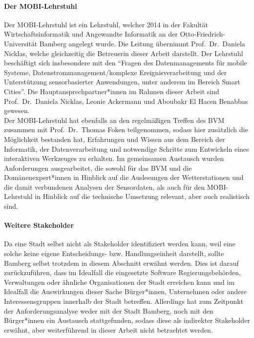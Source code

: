 \paragraph{Der \ac{MOBI-Lehrstuhl}}
Der \ac{MOBI-Lehrstuhl} ist ein Lehrstuhl, welcher 2014 in der Fakultät Wirtschaftsinformatik und Angewandte Informatik an der Otto-Friedrich-Universität Bamberg angelegt wurde. Die Leitung übernimmt Prof.\ Dr.\ Daniela Nicklas, welche gleichzeitig die Betreuerin dieser Arbeit darstellt. Der Lehrstuhl beschäftigt sich insbesondere mit den \enquote{Fragen des Datenmanagements für mobile Systeme, Datenstrommanagement/komplexe Ereignisverarbeitung und der Unterstützung sensorbasierter Anwendungen, unter anderem im Bereich Smart Cities}. Die Hauptansprechpartner*innen im Rahmen dieser Arbeit sind Prof.\ Dr.\ Daniela Nicklas, Leonie Ackermann und Aboubakr El Hacen Benabbas gewesen. \\ Der MOBI-Lehrstuhl hat ebenfalls an den regelmäßigen Treffen des \ac{BVM} zusammen mit Prof.\ Dr.\ Thomas Foken teilgenommen, sodass hier zusätzlich die Möglichkeit bestanden hat, Erfahrungen und Wissen aus dem Bereich der Informatik, der Datenverarbeitung und notwendige Schritte zum Entwickeln eines interaktiven Werkzeuges zu erhalten. Im gemeinsamen Austausch wurden Anforderungen ausgearbeitet, die sowohl für das \ac{BVM} und die Domänenexpert*innen in Hinblick auf die Auslesungen der Wetterstationen und die damit verbundenen Analysen der Sensordaten, als auch für den \ac{MOBI-Lehrstuhl} in Hinblick auf die technische Umsetzung relevant, aber auch realistisch sind. 

\paragraph{Weitere Stakeholder}
Da eine Stadt selbst nicht als Stakeholder identifiziert werden kann, weil eine solche keine eigene Entscheidungs- bzw. Handlungseinheit darstellt, sollte Bamberg selbst trotzdem in diesem Abschnitt erwähnt werden. Dies ist darauf zurückzuführen, dass im Idealfall die eingesetzte Software Regierungsbehörden, Verwaltungen oder ähnliche Organisationen der Stadt erreichen kann und im Idealfall die Auswirkungen dieser Sache Bürger*innen, Unternehmen oder andere Interessensgruppen innerhalb der Stadt betreffen. Allerdings hat zum Zeitpunkt der Anforderungsanalyse weder mit der Stadt Bamberg, noch mit den Bürger*innen ein Austausch stattgefunden, sodass diese als indirekter Stakeholder erwähnt, aber weiterführend in dieser Arbeit nicht betrachtet werden.

